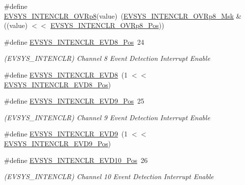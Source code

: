 \begin{DoxyCompactItemize}
\item 
\#define \mbox{\hyperlink{group___s_a_m_d21___e_v_s_y_s_ga80713e7459ffa4e0eb43795815f507f7}{E\+V\+S\+Y\+S\+\_\+\+I\+N\+T\+E\+N\+C\+L\+R\+\_\+\+O\+V\+Rp8}}(value)~(\mbox{\hyperlink{group___s_a_m_d21___e_v_s_y_s_ga06ab6f556646c922b24b17b4fda795b4}{E\+V\+S\+Y\+S\+\_\+\+I\+N\+T\+E\+N\+C\+L\+R\+\_\+\+O\+V\+Rp8\+\_\+\+Msk}} \& ((value) $<$$<$ \mbox{\hyperlink{group___s_a_m_d21___e_v_s_y_s_ga1e4280aa66c9190fb08ffbd40e41e88c}{E\+V\+S\+Y\+S\+\_\+\+I\+N\+T\+E\+N\+C\+L\+R\+\_\+\+O\+V\+Rp8\+\_\+\+Pos}}))
\item 
\#define \mbox{\hyperlink{group___s_a_m_d21___e_v_s_y_s_ga85400abd9d7ec1d4ffb5c25d41c52467}{E\+V\+S\+Y\+S\+\_\+\+I\+N\+T\+E\+N\+C\+L\+R\+\_\+\+E\+V\+D8\+\_\+\+Pos}}~24
\begin{DoxyCompactList}\small\item\em (E\+V\+S\+Y\+S\+\_\+\+I\+N\+T\+E\+N\+C\+LR) Channel 8 Event Detection Interrupt Enable \end{DoxyCompactList}\item 
\#define \mbox{\hyperlink{group___s_a_m_d21___e_v_s_y_s_gaba6341d7b1c5e957a5102bd383dbb2ca}{E\+V\+S\+Y\+S\+\_\+\+I\+N\+T\+E\+N\+C\+L\+R\+\_\+\+E\+V\+D8}}~(1 $<$$<$ \mbox{\hyperlink{group___s_a_m_d21___e_v_s_y_s_ga85400abd9d7ec1d4ffb5c25d41c52467}{E\+V\+S\+Y\+S\+\_\+\+I\+N\+T\+E\+N\+C\+L\+R\+\_\+\+E\+V\+D8\+\_\+\+Pos}})
\item 
\#define \mbox{\hyperlink{group___s_a_m_d21___e_v_s_y_s_ga2b50eaa4b72ed403723b2965febd9a84}{E\+V\+S\+Y\+S\+\_\+\+I\+N\+T\+E\+N\+C\+L\+R\+\_\+\+E\+V\+D9\+\_\+\+Pos}}~25
\begin{DoxyCompactList}\small\item\em (E\+V\+S\+Y\+S\+\_\+\+I\+N\+T\+E\+N\+C\+LR) Channel 9 Event Detection Interrupt Enable \end{DoxyCompactList}\item 
\#define \mbox{\hyperlink{group___s_a_m_d21___e_v_s_y_s_ga48d49311decae6d29f14e12f6bdc2c1d}{E\+V\+S\+Y\+S\+\_\+\+I\+N\+T\+E\+N\+C\+L\+R\+\_\+\+E\+V\+D9}}~(1 $<$$<$ \mbox{\hyperlink{group___s_a_m_d21___e_v_s_y_s_ga2b50eaa4b72ed403723b2965febd9a84}{E\+V\+S\+Y\+S\+\_\+\+I\+N\+T\+E\+N\+C\+L\+R\+\_\+\+E\+V\+D9\+\_\+\+Pos}})
\item 
\#define \mbox{\hyperlink{group___s_a_m_d21___e_v_s_y_s_gaf70107c8dc224642cfc2a07320d504c3}{E\+V\+S\+Y\+S\+\_\+\+I\+N\+T\+E\+N\+C\+L\+R\+\_\+\+E\+V\+D10\+\_\+\+Pos}}~26
\begin{DoxyCompactList}\small\item\em (E\+V\+S\+Y\+S\+\_\+\+I\+N\+T\+E\+N\+C\+LR) Channel 10 Event Detection Interrupt Enable \end{DoxyCompactList}\item 
$$
\end{DoxyCompactItemize}
